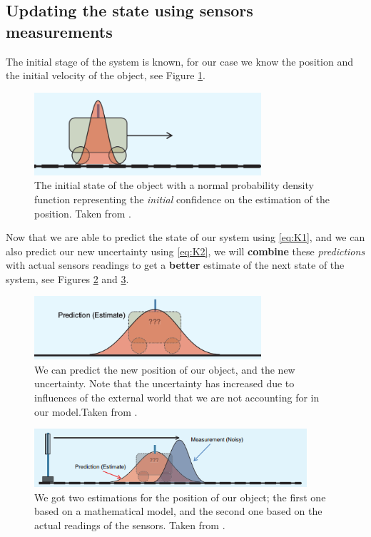 \documentclass[12pt,a4paper,final]{article} %
\begin{document}
\subsection{Updating the state using sensors measurements}
The initial stage of the system is known, for our case we know the
position and the initial velocity of the object, see Figure
\ref{fig:object_1D_01}.
\begin{figure}
  \centering
  \includegraphics[width=0.75\textwidth]{object_1D_01}
  \caption{The initial state of the object with a normal probability
    density function representing the \textit{initial} confidence on
    the estimation of the position. Taken from
    \cite{Faragher:2012:ARTICLE}.}
  \label{fig:object_1D_01}
\end{figure}

Now that we are able to predict the state of our system using
\eqref{eq:K1}, and we can also predict our new uncertainty using
\eqref{eq:K2}, we will \textbf{combine} these \textit{predictions}
with actual sensors readings to get a \textbf{better} estimate of the
next state of the system, see Figures \ref{fig:object_1D_02} and
\ref{fig:object_1D_03}.

\begin{figure}
  \centering
  \includegraphics[width=0.75\textwidth]{object_1D_02}
  \caption{We can predict the new position of our object, and the new
    uncertainty. Note that the uncertainty has increased due to
    influences of the external world that we are not accounting for in
    our model.Taken from \cite{Faragher:2012:ARTICLE}.}
  \label{fig:object_1D_02}
\end{figure}

\begin{figure}
  \centering
  \includegraphics[width=0.90\textwidth]{object_1D_03}
  \caption{We got two estimations for the position of our object; the
    first one based on a mathematical model, and the second one based
    on the actual readings of the sensors. Taken from
    \cite{Faragher:2012:ARTICLE}.}
  \label{fig:object_1D_03}
\end{figure}
\end{document}
